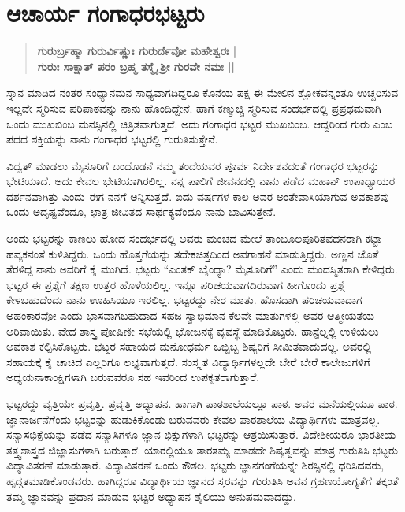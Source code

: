 \chapter{ಆಚಾರ್ಯ ಗಂಗಾಧರಭಟ್ಟರು}

\begin{center}
\smallskip

\end{center}
\begin{verse}
\textbf{ಗುರುರ್ಬ್ರಹ್ಮಾ ಗುರುರ್ವಿಷ್ಣುಃ ಗುರುರ್ದೆವೋ ಮಹೇಶ್ವರಃ |\\
ಗುರುಃ ಸಾಕ್ಷಾತ್ ಪರಂ ಬ್ರಹ್ಮ ತಸ್ಮೈ ಶ್ರೀ ಗುರವೇ ನಮಃ ||}
\end{verse}
ಸ್ನಾನ ಮಾಡಿದ ನಂತರ ಸಂಧ್ಯಾನಮನ ಸಾಧ್ಯವಾಗದಿದ್ದರೂ ಕೊನೆಯ ಪಕ್ಷ ಈ ಮೇಲಿನ ಶ್ಲೋಕವನ್ನಂತೂ ಉಚ್ಚರಿಸುವ ಇಲ್ಲವೇ ಸ್ಮರಿಸುವ ಪರಿಪಾಠವನ್ನು ನಾನು ಹೊಂದಿದ್ದೇನೆ. ಹಾಗೆ ಕಣ್ಮುಚ್ಚಿ ಸ್ಮರಿಸುವ ಸಂದರ್ಭದಲ್ಲಿ ಪ್ರಪ್ರಥಮವಾಗಿ ಒಂದು ಮುಖಬಿಂಬ ಮನಸ್ಸಿನಲ್ಲಿ ಚಿತ್ರಿತವಾಗುತ್ತದೆ. ಅದು ಗಂಗಾಧರ ಭಟ್ಟರ ಮುಖಬಿಂಬ. ಆದ್ದರಿಂದ ಗುರು ಎಂಬ ಪದದ ಶಕ್ತಿಯನ್ನು ನಾನು ಗಂಗಾಧರ ಭಟ್ಟರಲ್ಲಿ ಗುರುತಿಸುತ್ತೇನೆ.

ವಿದ್ವತ್ ಮಾಡಲು ಮೈಸೂರಿಗೆ ಬಂದೊಡನೆ ನಮ್ಮ ತಂದೆಯವರ ಪೂರ್ವ ನಿರ್ದೇಶನದಂತೆ ಗಂಗಾಧರ ಭಟ್ಟರನ್ನು ಭೇಟಿಯಾದೆ. ಅದು ಕೇವಲ ಭೇಟಿಯಾಗಿರಲಿಲ್ಲ. ನನ್ನ ಪಾಲಿಗೆ ಜೀವನದಲ್ಲಿ ನಾನು ಪಡೆದ ಮಹಾನ್ ಉಪಾಧ್ಯಾಯರ ದರ್ಶನವಾಗಿತ್ತು ಎಂದು ಈಗ ನನಗೆ ಅನ್ನಿಸುತ್ತದೆ. ಐದು ವರ್ಷಗಳ ಕಾಲ ಅವರ ಅಂತೇವಾಸಿಯಾಗುವ ಅವಕಾಶವು ಒಂದು ಅದೃಷ್ಟವೆಂದೂ, ಛಾತ್ರ ಜೀವಿತದ ಸಾರ್ಥಕ್ಯವೆಂದೂ ನಾನು ಭಾವಿಸುತ್ತೇನೆ.

ಅಂದು ಭಟ್ಟರನ್ನು ಕಾಣಲು ಹೋದ ಸಂದರ್ಭದಲ್ಲಿ ಅವರು ಮಂಚದ ಮೇಲೆ ತಾಂಬೂಲಪೂರಿತವದನರಾಗಿ ಕಟ್ಟಾ ಹವ್ಯಕನಂತೆ ಕುಳಿತಿದ್ದರು. ಒಂದು ಹೊತ್ತಗೆಯನ್ನು ತದೇಕಚಿತ್ತದಿಂದ ಅವಗಾಹನೆ ಮಾಡುತ್ತಿದ್ದರು. ಅಣ್ಣನ ಜೊತೆ ತೆರಳಿದ್ದ ನಾನು ಅವರಿಗೆ ಕೈ ಮುಗಿದೆ. ಭಟ್ಟರು “ಎಂತಕ್ ಬೈಂದ್ಯಾ? ಮೈಸೂರಿಗೆ” ಎಂದು ಮಂದಸ್ಮಿತರಾಗಿ ಕೇಳಿದ್ದರು. ಭಟ್ಟರ ಈ ಪ್ರಶ್ನೆಗೆ ತಕ್ಷಣ ಉತ್ತರ ಹೊಳೆಯಲಿಲ್ಲ. ಇನ್ನೂ ಪರಿಚಯವಾಗದಿರುವಾಗ ಹೀಗೊಂದು ಪ್ರಶ್ನೆ ಕೇಳಬಹುದೆಂದು ನಾನು ಊಹಿಸಿಯೂ ಇರಲಿಲ್ಲ. ಭಟ್ಟರದ್ದು ನೇರ ಮಾತು. ಹೊಸದಾಗಿ ಪರಿಚಯವಾದಾಗ ಅಹಂಕಾರವೋ ಎಂದು ಭಾಸವಾಗಬಹುದಾದ ಸಹಜ ಸ್ವಾಭಿಮಾನ ಕೆಲವೇ ಮಾತುಗಳಲ್ಲಿ ಅವರ ಆತ್ಮೀಯತೆಯ ಅರಿವಾಯಿತು. ವೇದ ಶಾಸ್ತ್ರ ಪೋಷಿಣೀ ಸಭೆಯಲ್ಲಿ ಭೋಜನಕ್ಕೆ ವ್ಯವಸ್ಥೆ ಮಾಡಿಕೊಟ್ಟರು. ಹಾಸ್ಟೆಲ್ನಲ್ಲಿ ಉಳಿಯಲು ಅವಕಾಶ ಕಲ್ಪಿಸಿಕೊಟ್ಟರು. ಭಟ್ಟರ ಸಹಾಯದ ಮನೋಧರ್ಮ ಒಬ್ಬಿಬ್ಬ ಶಿಷ್ಯರಿಗೆ ಸೀಮಿತವಾದುದಲ್ಲ. ಅವರಲ್ಲಿ ಸಹಾಯಕ್ಕೆ ಕೈ ಚಾಚಿದ ಎಲ್ಲರಿಗೂ ಲಭ್ಯವಾಗುತ್ತದೆ. ಸಂಸ್ಕೃತ ವಿದ್ಯಾರ್ಥಿಗಳಲ್ಲದೇ ಬೇರೆ ಬೇರೆ ಕಾಲೇಜುಗಳಿಗೆ ಅಧ್ಯಯನಾಕಾಂಕ್ಷಿಗಳಾಗಿ ಬರುವವರೂ ಸಹ ಇವರಿಂದ ಉಪಕೃತರಾಗುತ್ತಾರೆ.

ಭಟ್ಟರದ್ದು ವೃತ್ತಿಯೇ ಪ್ರವೃತ್ತಿ. ಪ್ರವೃತ್ತಿ ಅಧ್ಯಾಪನ. ಹಾಗಾಗಿ ಪಾಠಶಾಲೆಯಲ್ಲೂ ಪಾಠ. ಅವರ ಮನೆಯಲ್ಲಿಯೂ ಪಾಠ. ಜ್ಞಾನಾರ್ಜನೆಗೆಂದು ಭಟ್ಟರನ್ನು ಹುಡುಕಿಕೊಂಡು ಬರುವವರು ಕೇವಲ ಪಾಠಶಾಲೆಯ ವಿದ್ಯಾರ್ಥಿಗಳು ಮಾತ್ರವಲ್ಲ. ಸನ್ಯಾಸಭಿಕ್ಷೆಯನ್ನು ಪಡೆದ ಸನ್ಯಾಸಿಗಳೂ ಜ್ಞಾನ ಭಿಕ್ಷುಗಳಾಗಿ ಭಟ್ಟರನ್ನು ಆಶ್ರಯಿಸುತ್ತಾರೆ. ವಿದೇಶೀಯರೂ ಭಾರತೀಯ ತತ್ತ್ವಶಾಸ್ತ್ರದ ಜಿಜ್ಞಾಸುಗಳಾಗಿ ಬರುತ್ತಾರೆ. ಯಾರಲ್ಲಿಯೂ ತಾರತಮ್ಯ ಮಾಡದೇ ಶಿಷ್ಯತ್ವವನ್ನು ಮಾತ್ರ ಗುರುತಿಸಿ ಭಟ್ಟರು ವಿದ್ಯಾವಿತರಣೆ ಮಾಡುತ್ತಾರೆ. ವಿದ್ಯಾವಿತರಣೆ ಒಂದು ಕೌಶಲ. ಭಟ್ಟರು ಜ್ಞಾನಗಂಗೆಯನ್ನೇ ಶಿರಸ್ಸಿನಲ್ಲಿ ಧರಿಸಿದವರು, ಹೃದ್ಗತಮಾಡಿಕೊಂಡವರು. ಹಾಗಿದ್ದರೂ ವಿದ್ಯಾರ್ಥಿಯ ಜ್ಞಾನದ ಸ್ತರವನ್ನು ಗುರುತಿಸಿ ಅವನ ಗ್ರಹಣಯೋಗ್ಯತೆಗೆ ತಕ್ಕಂತೆ ತಮ್ಮ ಜ್ಞಾನವನ್ನು ಪ್ರದಾನ ಮಾಡುವ ಭಟ್ಟರ ಅಧ್ಯಾಪನ ಶೈಲಿಯು ಅನುಪಮವಾದದ್ದು.

